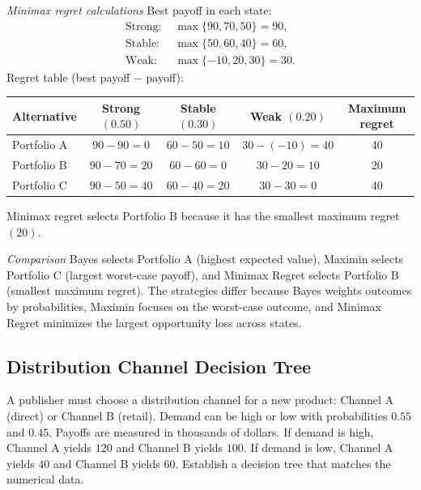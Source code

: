 \begin{ExamProblems}
		\textit{Minimax regret calculations}
		Best payoff in each state:
		\[
		\begin{aligned}
		\text{Strong: } &\max\{90,70,50\}=90,\\
		\text{Stable: } &\max\{50,60,40\}=60,\\
		\text{Weak: } &\max\{-10,20,30\}=30.
		\end{aligned}
		\]
		Regret table (best payoff $-$ payoff):
		\begin{center}
			\begin{tabular}{l c c c c}
				\toprule
				Alternative & Strong $(0.50)$ & Stable $(0.30)$ & Weak $(0.20)$ & Maximum regret \\
				\midrule
				Portfolio A & $90-90=0$ & $60-50=10$ & $30-(-10)=40$ & 40 \\
				Portfolio B & $90-70=20$ & $60-60=0$ & $30-20=10$ & 20 \\
				Portfolio C & $90-50=40$ & $60-40=20$ & $30-30=0$ & 40 \\
				\bottomrule
			\end{tabular}
		\end{center}
		Minimax regret selects Portfolio B because it has the smallest maximum regret $(20)$.
		
		\textit{Comparison}
		Bayes selects Portfolio A (highest expected value), Maximin selects Portfolio C (largest worst-case payoff), and Minimax Regret selects Portfolio B (smallest maximum regret).
		The strategies differ because Bayes weights outcomes by probabilities, Maximin focuses on the worst-case outcome, and Minimax Regret minimizes the largest opportunity loss across states.
		
		\item
		\subsection*{Distribution Channel Decision Tree}
		A publisher must choose a distribution channel for a new product: Channel A (direct) or Channel B (retail).
		Demand can be high or low with probabilities $0.55$ and $0.45$. Payoffs are measured in thousands of dollars.
		If demand is high, Channel A yields $120$ and Channel B yields $100$. If demand is low, Channel A yields $40$ and Channel B yields $60$.
		Establish a decision tree that matches the numerical data.
		

\end{ExamProblems}
